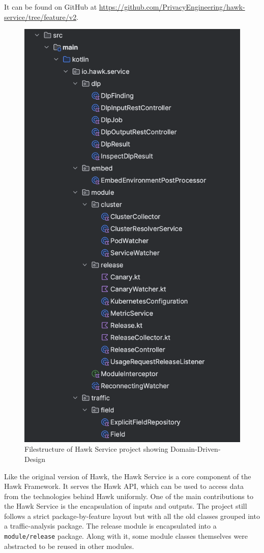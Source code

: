 It can be found on GitHub at \url{https://github.com/PrivacyEngineering/hawk-service/tree/feature/v2}.

\begin{figure}[!htb]
  \centering

  \includegraphics[width=0.95\columnwidth]{hawk-service-file.png}

  \caption[Hawk Service file structure]{Filestructure of Hawk Service project showing Domain-Driven-Design}  
  \label{fig:hawk-dlp-uml}
\end{figure}
Like the original version of Hawk, the Hawk Service is a core component of the Hawk Framework. It serves the Hawk API, which can be used to access data from the technologies behind Hawk uniformly. One of the main contributions to the Hawk Service is the encapsulation of inputs and outputs. The project still follows a strict package-by-feature layout but with all the old classes grouped into a traffic-analysis package. The release module is encapsulated into a \texttt{module/release} package. Along with it, some module classes themselves were abstracted to be reused in other modules.

